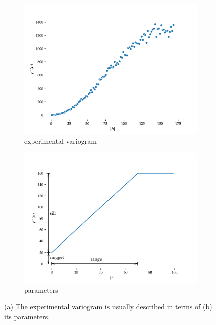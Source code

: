 \begin{figure}[htbp]
\begin{subfigure}{0.5\linewidth}
\centering
\includegraphics[width=\linewidth]{figs/experimental_variogram}
\caption{experimental variogram}
\end{subfigure}%
\begin{subfigure}{0.5\linewidth}
\centering
\includegraphics[width=\linewidth]{figs/example_variogram}
\caption{parameters}
\end{subfigure}%
\caption{(a) The experimental variogram is usually described in terms of (b) its parameters.}%
\label{fig:experimental_variogram}
\end{figure}

